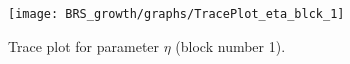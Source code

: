 \begin{figure}[H]
\centering
  \texttt{[image: BRS\_growth/graphs/TracePlot\_eta\_blck\_1]}\\
    \caption{Trace plot for parameter ${\eta}$ (block number 1).}
\end{figure}
